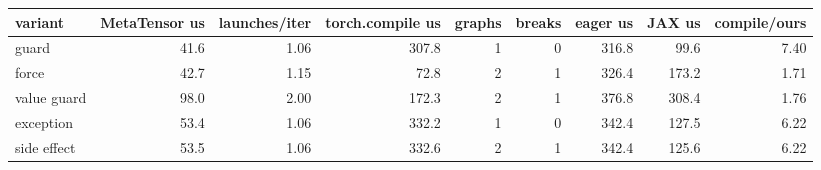\begin{tabular}{lrrrrrrrr}
\toprule
variant & MetaTensor us & launches/iter & torch.compile us & graphs & breaks & eager us & JAX us & compile/ours \\
\midrule
guard & 41.6 & 1.06 & 307.8 & 1 & 0 & 316.8 & 99.6 & 7.40 \\
force & 42.7 & 1.15 & 72.8 & 2 & 1 & 326.4 & 173.2 & 1.71 \\
value guard & 98.0 & 2.00 & 172.3 & 2 & 1 & 376.8 & 308.4 & 1.76 \\
exception & 53.4 & 1.06 & 332.2 & 1 & 0 & 342.4 & 127.5 & 6.22 \\
side effect & 53.5 & 1.06 & 332.6 & 2 & 1 & 342.4 & 125.6 & 6.22 \\
\bottomrule
\end{tabular}
